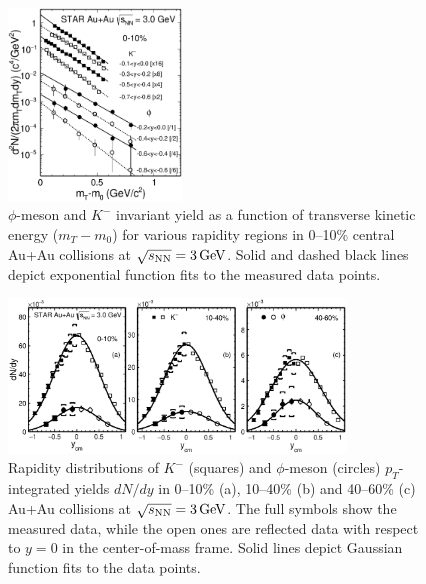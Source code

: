 \documentclass[%
 reprint,	
showpacs,
 amsmath,amssymb,
 aps,
 prc,
]{revtex4-1}
\begin{document}
\begin{figure}
\centering
\includegraphics[width=0.41\textwidth]{fig/fig2_h_mT_spectra_phiMeson.eps}
  \caption{ $\phi$-meson and $K^-$ invariant yield as a function of transverse kinetic energy ($m_T-m_0$) for various rapidity regions in 0--10\% central Au+Au collisions at ${\sqrt{s_{\rm NN}} = \rm{3\,GeV}}$. Solid and dashed black lines depict exponential function fits to the measured data points.}
\label{fig:phimTSpectra} 
\end{figure}


\begin{table}
\label{table:singlecut} 
\end{table}

\begin{figure}
\centering
\includegraphics[width=0.8\textwidth]{fig/fig3_dndy.eps}
  \caption{ Rapidity distributions of $K^-$ (squares) and $\phi$-meson (circles) $p_T$-integrated yields $dN/dy$ in 0--10\% (a), 10--40\% (b) and 40--60\% (c) Au+Au collisions at ${\sqrt{s_{\rm NN}} = \rm{3\,GeV}}$. The full symbols show the measured data, while the open ones are reflected data with respect to $y=0$ in the center-of-mass frame. Solid lines depict Gaussian function fits to the data points.}
\label{fig:phiYSpectra} 
\end{figure}
\end{document}
